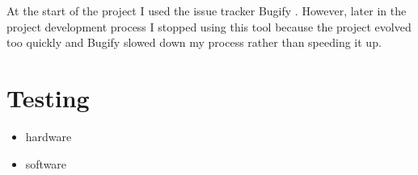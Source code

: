 At the start of the project I used the issue tracker Bugify . However, later in the project development process I stopped using this tool because the project evolved too quickly and Bugify slowed down my process rather than speeding it up. 

\section{Testing}
\begin{itemize}
\item hardware
\item software
\end{itemize}
